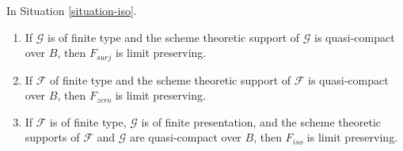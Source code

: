 \begin{lemma}
\label{lemma-iso-limits}
In Situation \ref{situation-iso}.
\begin{enumerate}
\item If $\mathcal{G}$ is of finite type and the scheme theoretic support
of $\mathcal{G}$ is quasi-compact over $B$, then $F_{surj}$ is limit
preserving.
\item If $\mathcal{F}$ of finite type and the scheme theoretic support
of $\mathcal{F}$ is quasi-compact over $B$, then
$F_{zero}$ is limit preserving.
\item If $\mathcal{F}$ is of finite type,
$\mathcal{G}$ is of finite presentation, and the
scheme theoretic supports of $\mathcal{F}$ and $\mathcal{G}$ are
quasi-compact over $B$, then $F_{iso}$ is limit preserving.
\end{enumerate}
\end{lemma}


